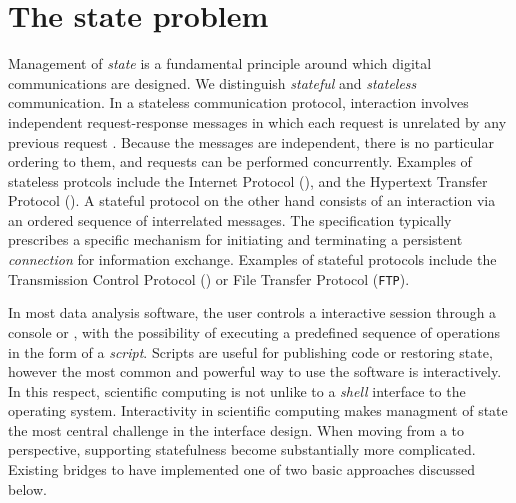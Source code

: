 \section{The state problem}

Management of \emph{state} is a fundamental principle around which digital communications are designed. We distinguish \emph{stateful} and \emph{stateless} communication. In a stateless communication protocol, interaction involves independent request-response messages in which each request is unrelated by any previous request \citep{hennessy2012computer}. Because the messages are independent, there is no particular ordering to them, and requests can be performed concurrently. Examples of stateless protcols include the Internet Protocol (\IP), and the Hypertext Transfer Protocol (\HTTP). A stateful protocol on the other hand consists of an interaction via an ordered sequence of interrelated messages. The specification typically prescribes a specific mechanism for initiating and terminating a persistent \emph{connection} for information exchange. Examples of stateful protocols include the Transmission Control Protocol (\TCP) or File Transfer Protocol (\texttt{FTP}).


In most data analysis software, the user controls a interactive session through a console or \GUI, with the possibility of executing a predefined sequence of operations in the form of a \emph{script}. Scripts are useful for publishing code or restoring state, however the most common and powerful way to use the software is interactively. In this respect, scientific computing is not unlike to a \emph{shell} interface to the operating system. Interactivity in scientific computing makes managment of state the most central challenge in the interface design. When moving from a \UI to \API perspective, supporting statefulness become substantially more complicated. Existing bridges to \R have implemented one of two basic approaches discussed below. 

